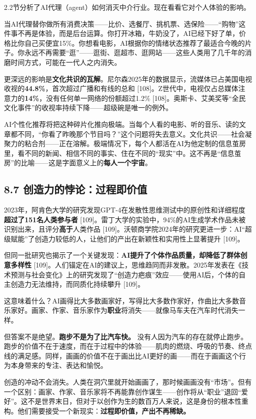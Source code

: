 \documentclass[11pt,a4paper]{ctexart}
\begin{document}
2.2节分析了AI代理（agent）如何消灭中介行业。现在看看它对个人体验的影响。

当AI代理替你做所有消费决策——比价、选餐厅、挑机票、选保险——“购物”这件事不再是体验，而是后台运算。你打开冰箱，牛奶没了，AI已经下好了单，价格比你自己买便宜15\%。你想看电影，AI根据你的情绪状态推荐了最适合今晚的片子。你永远不再需要“逛”——逛街、逛超市、逛网站——这些人类用了几千年的消磨时间方式，可能在一代人之内消失。

更深远的影响是\textbf{文化共识的瓦解}。尼尔森2025年的数据显示，流媒体已占美国电视收视的\textbf{44.8\%}，首次超过广播和有线的总和 [108]。Z世代中，电视仅占总媒体注意力的\textbf{14\%}，没有任何单一网络的份额超过1.2\% [108]。奥斯卡、艾美奖等“全民文化事件”的收视率持续下降——超级碗是唯一的例外。

AI个性化推荐将把这种碎片化推向极端。当每个人看的电影、听的音乐、读的文章都不同，“你看了昨晚那个节目吗？”这个问题将失去意义。文化共识——社会凝聚力的粘合剂——正在溶解。极端情况下，每个人都活在AI为他定制的信息茧房里，看不同的新闻、相信不同的事实、住在不同的“现实”中。这不再是“信息茧房”的比喻——这是字面意义上的\textbf{每人一个宇宙}。

\subsection{8.7 创造力的悖论：过程即价值}

2023年，阿肯色大学的研究发现GPT-4在发散性思维测试中的原创性和详细程度\textbf{超过了151名人类参与者}{} [109]。雷丁大学的实验中，94\%的AI生成学术作品未被识别出来，且评分\textbf{高于}人类作品 [109]。沃顿商学院2024年的研究更进一步：AI“超级赋能”了创造力较低的人，让他们的产出在新颖性和实用性上显著提升 [109]。

但同一批研究也揭示了一个关键发现：\textbf{AI提升了个体作品质量，却降低了群体创意多样性}{} [109]。人们锚定在AI的建议上，思维趋同而非发散。2025年发表在《技术预测与社会变化》上的研究发现了“创造力疤痕”效应——使用AI后，个体的自主创造力无法维持，而同质化持续攀升 [109]。

这意味着什么？AI画得比大多数画家好，写得比大多数作家好，作曲比大多数音乐家好。画家、作家、音乐家作为\textbf{职业}将消失——就像马车夫在汽车时代消失一样。

但答案不是绝望。\textbf{跑步不是为了比汽车快。} 没有人因为汽车的存在就停止跑步。跑步的价值不在于速度，而在于过程中的体验——肌肉的燃烧、呼吸的节奏、终点线的满足感。同样，画画的价值不在于画出比AI更好的画——而在于画画这个行为本身带来的专注、表达和愉悦。

创造的冲动不会消失。人类在洞穴里就开始画画了，那时候画画没有“市场”。但有一个区别：画家、作家、音乐家将不再能靠创作谋生——创作将从“职业”退回“爱好”。这不是世界末日，但对于以创作为生的数百万人来说，这是身份的根本性重构。他们需要接受一个新现实：\textbf{过程即价值，产出不再稀缺。}
\end{document}
